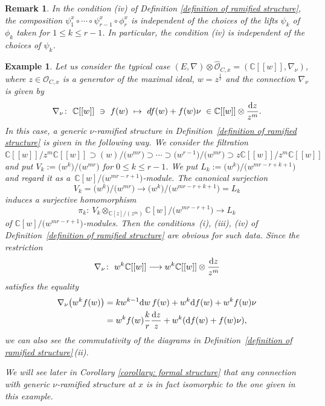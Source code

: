 \documentclass[pdftex]{sigma}
\numberwithin{equation}{section}
\newtheorem{Example}[Theorem]{Example}
\newtheorem{Remark}[Theorem]{Remark}
\begin{document}
\begin{Remark} \rm
In the condition (iv) of Definition \ref{definition of ramified structure},
the composition
$\psi^x_1\circ\cdots\circ\psi^x_{r-1}\circ\phi^x_r$
is independent of the choices of the lifts
$\psi_k$ of $\phi_k$ taken for $1\leq k\leq r-1$.
In particular, the condition (iv) is independent of the choices of $\psi_k$.
\end{Remark}



\begin{Example}
\label{example: ramified structure} \rm
Let us consider the typical case
$(E,\nabla)\otimes\widehat{\mathcal O}_{C,x}
= (\mathbb{C}[[w]],\nabla_{\nu})$,
where $z\in{\mathcal O}_{C,x}$ is a generator of the maximal ideal,
$w=z^{\frac{1}{r}}$ and the connection $\nabla_{\nu}$ is given by
\[
 \nabla_{\nu} \colon \
 \mathbb{C}[[w]] \ \ni \ f(w) \ \mapsto \ df(w)+f(w)\nu \ \in \mathbb{C}[[w]]\otimes \frac{{\rm d}z}{z^m}.
\]
In this case, a generic $\nu$-ramified structure in Definition~\ref{definition of ramified structure}
is given in the following way.
We consider the filtration
$\mathbb{C}[[w]]/z^m\mathbb{C}[[w]]\supset(w)/\big(w^{mr}\big)\supset\cdots\supset
\big(w^{r-1}\big)/\big(w^{mr}\big)\supset z\mathbb{C}[[w]]/z^m\mathbb{C}[[w]]$
and put $V_k:=\big(w^k\big)/\big(w^{mr}\big)$ for $0\leq k\leq r-1$.
We put
$L_k:=\big(w^k\big)/\big(w^{mr-r+k+1}\big)$
and regard it as a~$\mathbb{C}[w]/\big(w^{mr-r+1}\big)$-module.
The canonical surjection
\[
V_k=\big(w^k\big)/\big(w^{mr}\big)\longrightarrow \big(w^k\big)/\big(w^{mr-r+k+1}\big)=L_k
\]
induces a surjective homomorphism
\[
 \pi_k\colon \ V_k\otimes_{\mathbb{C}[z]/(z^m)}\mathbb{C}[w]/\big(w^{mr-r+1}\big)
 \longrightarrow L_k
\]
of $\mathbb{C}[w]/\big(w^{mr-r+1}\big)$-modules.
Then the conditions~(i), (iii), (iv) of Definition~\ref{definition of ramified structure}
are obvious for such data.
Since the restriction
\[
 \nabla_{\nu}\colon \ w^k\mathbb{C}[[w]]\longrightarrow w^k\mathbb{C}[[w]]\otimes\frac{{\rm d}z}{z^m}
\]
satisfies the equality
\begin{align*}
 \nabla_{\nu}\big( w^kf(w) \big)& =kw^{k-1}{\rm d}w \, f(w)+w^k{\rm d}f(w)+w^kf(w)\nu\\
 & =w^kf(w)\frac{k}{r}\frac{{\rm d}z}{z}+w^k ( {\rm d}f(w)+f(w)\nu ),
\end{align*}
we can also see the commutativity of the diagrams
in Definition~\ref{definition of ramified structure}\,(ii).

We will see later in Corollary \ref{corollary: formal structure}
that any connection with generic $\nu$-ramified structure at $x$
is in fact isomorphic to the one given in this example.
\end{Example}
\end{document}
